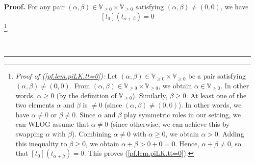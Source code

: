 \documentclass[numbers=enddot,12pt,final,onecolumn,notitlepage]{scrartcl}%
\theoremstyle{definition}
\newenvironment{proof}[1][Proof]{\noindent\textbf{#1.} }{\ \rule{0.5em}{0.5em}}
\renewcommand{\geq}{\geqslant}
\theoremstyle{plainsl}
\begin{document}
\begin{proof}
For any pair $\left(  \alpha,\beta\right)  \in\mathbb{V}_{\geq0}%
\times\mathbb{V}_{\geq0}$ satisfying $\left(  \alpha,\beta\right)  \neq\left(
0,0\right)  $, we have%
\begin{equation}
\left[  t_{0}\right]  \left(  t_{\alpha+\beta}\right)  =0
\label{pf.lem.piLK.tt=0}%
\end{equation}
\footnote{\textit{Proof of (\ref{pf.lem.piLK.tt=0}):} Let $\left(
\alpha,\beta\right)  \in\mathbb{V}_{\geq0}\times\mathbb{V}_{\geq0}$ be a pair
satisfying $\left(  \alpha,\beta\right)  \neq\left(  0,0\right)  $. From
$\left(  \alpha,\beta\right)  \in\mathbb{V}_{\geq0}\times\mathbb{V}_{\geq0}$,
we obtain $\alpha\in\mathbb{V}_{\geq0}$. In other words, $\alpha\geq0$ (by the
definition of $\mathbb{V}_{\geq0}$). Similarly, $\beta\geq0$. At least one of
the two elements $\alpha$ and $\beta$ is $\neq0$ (since $\left(  \alpha
,\beta\right)  \neq\left(  0,0\right)  $). In other words, we have $\alpha
\neq0$ or $\beta\neq0$. Since $\alpha$ and $\beta$ play symmetric roles in our
setting, we can WLOG assume that $\alpha\neq0$ (since otherwise, we can
achieve this by swapping $\alpha$ with $\beta$). Combining $\alpha\neq0$ with
$\alpha\geq0$, we obtain $\alpha>0$. Adding this inequality to $\beta\geq0$,
we obtain $\alpha+\beta>0+0=0$. Hence, $\alpha+\beta\neq0$, so that $\left[
t_{0}\right]  \left(  t_{\alpha+\beta}\right)  =0$. This proves
(\ref{pf.lem.piLK.tt=0}).}.


\end{proof}
\end{document}
